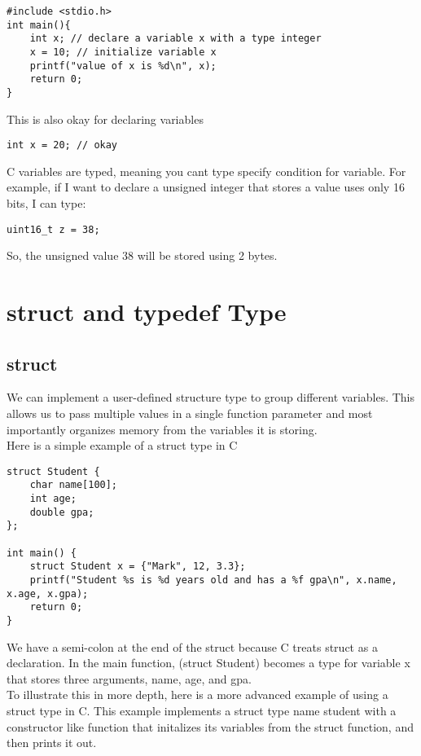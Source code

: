 \documentclass{article}
\begin{document}
\begin{verbatim}
#include <stdio.h>
int main(){
	int x; // declare a variable x with a type integer 
	x = 10; // initialize variable x
	printf("value of x is %d\n", x);
	return 0;
}
\end{verbatim}

\noindent This is also okay for declaring variables 

\begin{verbatim}
int x = 20; // okay
\end{verbatim} 

\noindent C variables are typed, meaning you cant type specify condition for variable. For example, if I want to declare a unsigned integer that stores a
value uses only 16 bits, I can type: 

\begin{verbatim}
uint16_t z = 38;
\end{verbatim}

So, the unsigned value 38 will be stored using 2 bytes.

\section{struct and typedef Type}
\subsection*{struct}
We can implement a user-defined structure type to group different variables. This allows us to pass multiple values in a single function parameter and 
most importantly organizes memory from the variables it is storing. \\

Here is a simple example of a struct type in C

\begin{verbatim}
struct Student {
	char name[100];
	int age;
	double gpa;
};

int main() {
	struct Student x = {"Mark", 12, 3.3};
	printf("Student %s is %d years old and has a %f gpa\n", x.name, x.age, x.gpa);
	return 0;
}
\end{verbatim}

We have a semi-colon at the end of the struct because C treats struct as a declaration. In the main function, (struct Student) becomes a type for
variable x that stores three arguments, name, age, and gpa.\\

\noindent To illustrate this in more depth, here is a more advanced example of using a struct type in C. This example implements a struct type name student
with a constructor like function that initalizes its variables from the struct function, and then prints it out.
\end{document}
